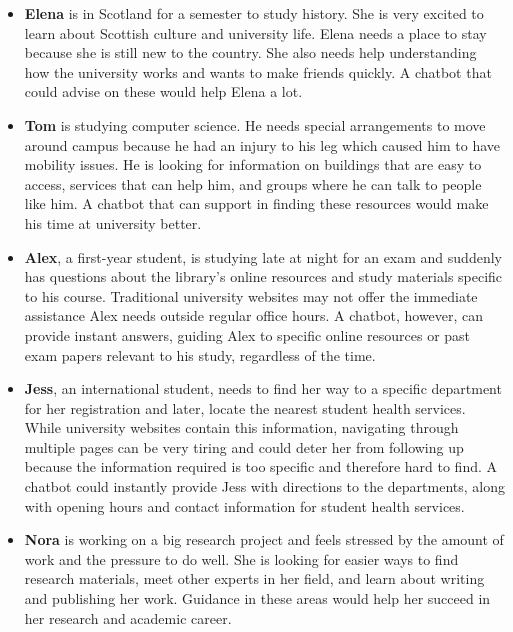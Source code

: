 \documentclass{l4proj}
\begin{document}
\begin{itemize}
    \item \textbf{Elena} is in Scotland for a semester to study history. She is very excited to learn about Scottish culture and university life. Elena needs a place to stay because she is still new to the country. She also needs help understanding how the university works and wants to make friends quickly. A chatbot that could advise on these would help Elena a lot.

    \item \textbf{Tom} is studying computer science. He needs special arrangements to move around campus because he had an injury to his leg which caused him to have mobility issues. He is looking for information on buildings that are easy to access, services that can help him, and groups where he can talk to people like him. A chatbot that can support in finding these resources would make his time at university better.
    
    \item \textbf{Alex}, a first-year student, is studying late at night for an exam and suddenly has questions about the library's online resources and study materials specific to his course. Traditional university websites may not offer the immediate assistance Alex needs outside regular office hours. A chatbot, however, can provide instant answers, guiding Alex to specific online resources or past exam papers relevant to his study, regardless of the time.

    \item \textbf{Jess}, an international student, needs to find her way to a specific department for her registration and later, locate the nearest student health services. While university websites contain this information, navigating through multiple pages can be very tiring and could deter her from following up because the information required is too specific and therefore hard to find. A chatbot could instantly provide Jess with directions to the departments, along with opening hours and contact information for student health services.

    \item \textbf{Nora} is working on a big research project and feels stressed by the amount of work and the pressure to do well. She is looking for easier ways to find research materials, meet other experts in her field, and learn about writing and publishing her work. Guidance in these areas would help her succeed in her research and academic career.
\end{itemize}
\end{document}
